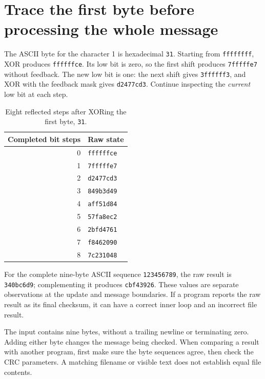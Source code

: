 \section{Trace the first byte before processing the whole message}
The ASCII byte for the character 1 is hexadecimal \texttt{31}. Starting from
\texttt{ffffffff}, XOR produces \texttt{ffffffce}. Its low bit is zero, so the
first shift produces \texttt{7fffffe7} without feedback. The new low bit is one:
the next shift gives \texttt{3ffffff3}, and XOR with the feedback mask gives
\texttt{d2477cd3}. Continue inspecting the \emph{current} low bit at each step.

\begin{table}[htbp]
\centering
\caption{Eight reflected steps after XORing the first byte, \texttt{31}.}
\begin{tabular}{rl}
\toprule
Completed bit steps & Raw state\\
\midrule
0 & \texttt{ffffffce}\\
1 & \texttt{7fffffe7}\\
2 & \texttt{d2477cd3}\\
3 & \texttt{849b3d49}\\
4 & \texttt{aff51d84}\\
5 & \texttt{57fa8ec2}\\
6 & \texttt{2bfd4761}\\
7 & \texttt{f8462090}\\
8 & \texttt{7c231048}\\
\bottomrule
\end{tabular}
\end{table}

For the complete nine-byte ASCII sequence \texttt{123456789}, the raw result is
\texttt{340bc6d9}; complementing it produces \texttt{cbf43926}. These values are
separate observations at the update and message boundaries. If a program reports the
raw result as its final checksum, it can have a correct inner loop and an incorrect
file result.

The input contains nine bytes, without a trailing newline or terminating zero. Adding
either byte changes the message being checked. When comparing a result with another
program, first make sure the byte sequences agree, then check the CRC parameters.
A matching filename or visible text does not establish equal file contents.
